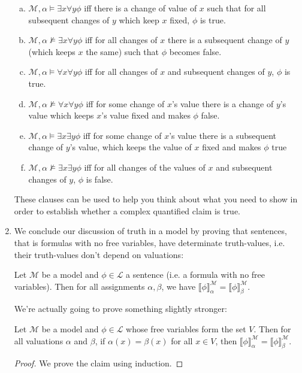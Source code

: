 \begin{enumerate}[\thesection.1]
		\begin{enumerate}[(a)]
		
		  \item $\mathcal{M},\alpha\vDash \exists x\forall y \phi$
			iff there is a change of value of $x$ such that for all subsequent changes of $y$ which keep $x$ fixed, $\phi$ is true.
		
		  \item $\mathcal{M},\alpha\nvDash \exists x\forall y\phi$
			iff for all changes of $x$ there is a subsequent change of $y$ (which keeps $x$ the same) such that $\phi$ becomes false.
		
		  \item $\mathcal{M},\alpha\vDash \forall x\forall y\phi$
			iff for all changes of $x$ and subsequent changes of $y$, $\phi$ is true.
		
		  \item $\mathcal{M},\alpha\nvDash \forall x\forall y\phi$
			iff for some change of $x$'s value there is a change of $y$'s value which keeps $x$'s value fixed and makes $\phi$ false.
		
		  \item $\mathcal{M},\alpha\vDash \exists x\exists y\phi$
			iff for some change of $x$'s value there is a subsequent change of $y$'s value, which keeps the value of $x$ fixed and makes $\phi$ true
		
		  \item $\mathcal{M},\alpha\nvDash \exists x\exists y\phi$
			iff for all changes of the values of $x$ and subsequent changes of $y$, $\phi$ is false.
		
		\end{enumerate}	
		
		These clauses can be used to help you think about what you need to show in order to establish whether a complex quantified claim is true.
		
		\item We conclude our discussion of truth in a model by proving that sentences, that is formulas with no free variables, have determinate truth-values, i.e. their truth-values don't depend on valuations:
		\begin{proposition}
		Let $\mathcal{M}$ be a model and $\phi\in\mathcal{L}$ a sentence (i.e. a formula with no free variables). Then for all assignments $\alpha,\beta$, we have $\llbracket\phi\rrbracket_\alpha^\mathcal{M}=\llbracket\phi\rrbracket_\beta^\mathcal{M}$.
		\end{proposition}
		We're actually going to prove something slightly stronger:
		\begin{lemma}
		Let $\mathcal{M}$ be a model and $\phi\in\mathcal{L}$ whose free variables form the set $V$. Then for all valuations $\alpha$ and $\beta$, if $\alpha(x)=\beta(x)$ for all $x\in V$, then $\llbracket\phi\rrbracket_\alpha^\mathcal{M}=\llbracket\phi\rrbracket_\beta^\mathcal{M}$.
		\end{lemma}
		\begin{proof}
		We prove the claim using induction.
		

\end{proof}
\end{enumerate}
